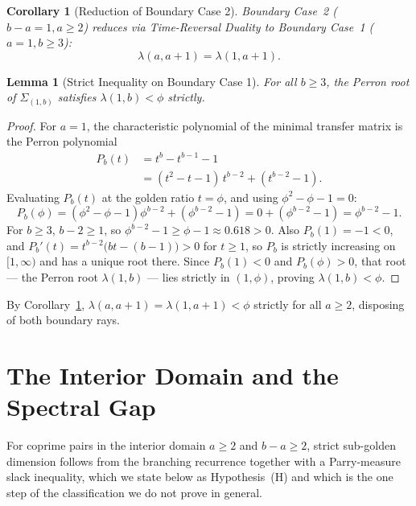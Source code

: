 \documentclass[11pt,reqno]{amsart}
\theoremstyle{plain}
\newtheorem{lemma}[theorem]{Lemma}
\newtheorem{corollary}[theorem]{Corollary}
\theoremstyle{definition}
\theoremstyle{remark}
\begin{document}
\begin{corollary}[Reduction of Boundary Case 2]\label{cor:boundary_reduction}
Boundary Case~2 ($b - a = 1, a \ge 2$) reduces via Time-Reversal Duality to Boundary Case~1 ($a = 1, b \ge 3$):
\begin{equation}
\lambda(a, a+1) = \lambda(1, a+1).
\end{equation}
\end{corollary}

\begin{lemma}[Strict Inequality on Boundary Case 1]\label{lem:boundary_strict}
For all $b \ge 3$, the Perron root of $\Sigma_{(1, b)}$ satisfies $\lambda(1, b) < \phi$ strictly.
\end{lemma}

\begin{proof}
For $a = 1$, the characteristic polynomial of the minimal transfer matrix is the Perron polynomial
\begin{align*}
P_b(t) &= t^b - t^{b-1} - 1 \\
&= (t^2 - t - 1)\, t^{b-2} + (t^{b-2} - 1).
\end{align*}
Evaluating $P_b(t)$ at the golden ratio $t = \phi$, and using $\phi^2 - \phi - 1 = 0$:
\begin{equation}
P_b(\phi) = (\phi^2 - \phi - 1) \phi^{b-2} + (\phi^{b-2} - 1) = 0 + (\phi^{b-2} - 1) = \phi^{b-2} - 1.
\end{equation}
For $b \ge 3$, $b - 2 \ge 1$, so $\phi^{b-2} - 1 \ge \phi - 1 \approx 0.618 > 0$. Also $P_b(1) = -1 < 0$, and $P_b'(t) = t^{b-2}\bigl(bt - (b-1)\bigr) > 0$ for $t \ge 1$, so $P_b$ is strictly increasing on $[1, \infty)$ and has a unique root there. Since $P_b(1) < 0$ and $P_b(\phi) > 0$, that root --- the Perron root $\lambda(1, b)$ --- lies strictly in $(1, \phi)$, proving $\lambda(1, b) < \phi$.
\end{proof}

By Corollary~\ref{cor:boundary_reduction}, $\lambda(a, a+1) = \lambda(1, a+1) < \phi$ strictly for all $a \ge 2$, disposing of both boundary rays.

\section{The Interior Domain and the Spectral Gap}\label{sec:interior}

For coprime pairs in the interior domain $a \ge 2$ and $b - a \ge 2$, strict sub-golden dimension follows from the branching recurrence together with a Parry-measure slack inequality, which we state below as Hypothesis~(H) and which is the one step of the classification we do not prove in general.
\end{document}
